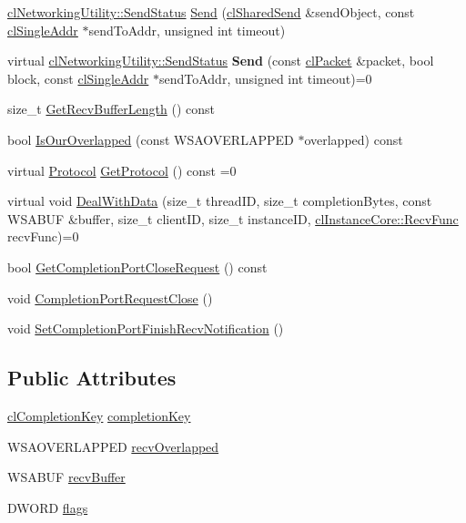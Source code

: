 \begin{DoxyCompactItemize}
\item 
\hyperlink{classcl_networking_utility_a19389cda12603396e03caa9d82073803}{clNetworkingUtility::SendStatus} \hyperlink{classcl_socket_a6645de6f69b91fdf30b0195c221e4e7c}{Send} (\hyperlink{classcl_shared_send}{clSharedSend} \&sendObject, const \hyperlink{classcl_single_addr}{clSingleAddr} $\ast$sendToAddr, unsigned int timeout)
\item 
\hypertarget{classcl_socket_ac24c3eed54aabf41a4447b7d63b2f39f}{
virtual \hyperlink{classcl_networking_utility_a19389cda12603396e03caa9d82073803}{clNetworkingUtility::SendStatus} {\bfseries Send} (const \hyperlink{classcl_packet}{clPacket} \&packet, bool block, const \hyperlink{classcl_single_addr}{clSingleAddr} $\ast$sendToAddr, unsigned int timeout)=0}
\label{classcl_socket_ac24c3eed54aabf41a4447b7d63b2f39f}

\item 
size\_\-t \hyperlink{classcl_socket_a1652cf24e9f2a5d83a463da184903f4f}{GetRecvBufferLength} () const 
\item 
bool \hyperlink{classcl_socket_a46bfeb517dceec7b2dfb72f77e1a6c99}{IsOurOverlapped} (const WSAOVERLAPPED $\ast$overlapped) const 
\item 
virtual \hyperlink{classcl_simple_socket_affcd3d22c1abba5d20a0ae93472c576d}{Protocol} \hyperlink{classcl_socket_a8ce9d2d6fa68c1d70fa757122093f7ca}{GetProtocol} () const =0
\item 
virtual void \hyperlink{classcl_socket_a4ddfb1b3168816c667e1193d1df42535}{DealWithData} (size\_\-t threadID, size\_\-t completionBytes, const WSABUF \&buffer, size\_\-t clientID, size\_\-t instanceID, \hyperlink{classcl_instance_core_afa96c2a2c0b26b6a9256b87798bf9587}{clInstanceCore::RecvFunc} recvFunc)=0
\item 
bool \hyperlink{classcl_socket_ab024e22508a2490cc4e41ca285adc55f}{GetCompletionPortCloseRequest} () const 
\item 
void \hyperlink{classcl_socket_a2ab21e84af02b22496fcc2e60549e9ce}{CompletionPortRequestClose} ()
\item 
void \hyperlink{classcl_socket_aadcd5e50e5dd9495e433a3be3ff69c31}{SetCompletionPortFinishRecvNotification} ()
\end{DoxyCompactItemize}
\subsection*{Public Attributes}
\begin{DoxyCompactItemize}
\item 
\hyperlink{classcl_completion_key}{clCompletionKey} \hyperlink{classcl_socket_a13f7fb8c9c146df5b8b63a861b1d9b05}{completionKey}
\item 
WSAOVERLAPPED \hyperlink{classcl_socket_aec458d824ec2454b0db2869fc8f87623}{recvOverlapped}
\item 
WSABUF \hyperlink{classcl_socket_aa33f69522e06a1ddaaf589cb21f0f60d}{recvBuffer}
\item 
DWORD \hyperlink{classcl_socket_a3d6b17db1b4743a14efcf02205113ae8}{flags}
\end{DoxyCompactItemize}
